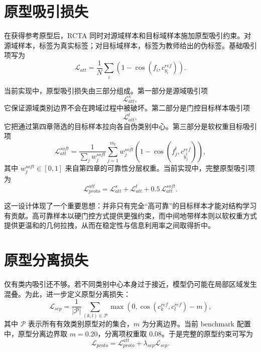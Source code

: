 \section{原型吸引损失}
在获得参考原型后，RCTA 同时对源域样本和目标域样本施加原型吸引约束。对源域样本，标签为真实标签；对目标域样本，标签为教师给出的伪标签。基础吸引项写为
\begin{equation}
\mathcal{L}_{att}=
\frac{1}{N}\sum_{i}
\left(
1-\cos(f_i,c_{y_i}^{ref})
\right).
\end{equation}

当前实现中，原型吸引损失由三部分组成。第一部分是源域吸引项
\begin{equation}
\mathcal{L}_{att}^{s},
\end{equation}
它保证源域类别边界不会在跨域过程中被破坏。第二部分是门控目标样本吸引项
\begin{equation}
\mathcal{L}_{att}^{t},
\end{equation}
它把通过第四章筛选的目标样本拉向各自伪类别中心。第三部分是软权重目标吸引项
\begin{equation}
\mathcal{L}_{att}^{soft}=
\frac{1}{\sum_j w_j^{soft}}
\sum_{j=1}^{m_t}
w_j^{soft}
\left(
1-\cos(f_j^{t},c_{\hat{y}_j^t}^{ref})
\right),
\end{equation}
其中 $w_j^{soft}\in[0,1]$ 来自第四章的可靠性分层权重。当前实现中，完整原型吸引项为
\begin{equation}
\mathcal{L}_{proto}^{att}=
\mathcal{L}_{att}^{s}
+\mathcal{L}_{att}^{t}
+0.5\,\mathcal{L}_{att}^{soft}.
\end{equation}

这一设计体现了一个重要思想：并非只有完全“高可靠”的目标样本才能对结构学习有贡献。高可靠样本以硬门控方式提供更强约束，而中间地带样本则以软权重方式提供更温和的几何拉拽，从而在稳定性与信息利用率之间取得折中。

\section{原型分离损失}
仅有类内吸引还不够。若不同类别中心本身过于接近，模型仍可能在局部区域发生混叠。为此，进一步定义原型分离损失：
\begin{equation}
\mathcal{L}_{sep}=
\frac{1}{|\mathcal{P}|}
\sum_{(k,l)\in\mathcal{P}}
\max\left(
0,\cos(c_k^{ref},c_l^{ref})-m
\right),
\end{equation}
其中 $\mathcal{P}$ 表示所有有效类别原型对的集合，$m$ 为分离边界。当前 benchmark 配置中，原型分离边界取 $m=0.20$，分离项权重取 0.08。于是完整的原型约束可写为
\begin{equation}
\mathcal{L}_{proto}=
\mathcal{L}_{proto}^{att}
+\lambda_{sep}\mathcal{L}_{sep}.
\end{equation}

